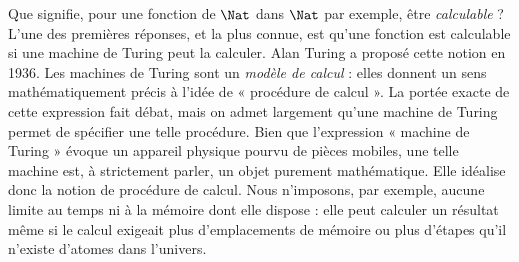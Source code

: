 \documentclass[../../../include/open-logic-section]{subfiles}
\begin{document}

Que signifie, pour une fonction de $\Nat$ dans
$\Nat$ par exemple, être \emph{calculable} ?
L'une des premières réponses, et la plus connue,
est qu'une fonction est calculable si une machine
de Turing peut la calculer. Alan Turing a proposé
cette notion en 1936. Les machines de Turing sont
un \emph{modèle de calcul} : elles donnent un sens
mathématiquement précis à l'idée de « procédure
de calcul ». La portée exacte de cette expression
fait débat, mais on admet largement qu'une machine
de Turing permet de spécifier une telle procédure.
Bien que l'expression « machine de Turing » évoque
un appareil physique pourvu de pièces mobiles,
une telle machine est, à strictement parler,
un objet purement mathématique. Elle idéalise
donc la notion de procédure de calcul. Nous
n'imposons, par exemple, aucune limite au temps
ni à la mémoire dont elle dispose : elle peut
calculer un résultat même si le calcul exigeait
plus d'emplacements de mémoire ou plus d'étapes
qu'il n'existe d'atomes dans l'univers.
\end{document}
